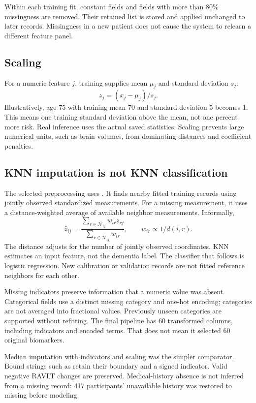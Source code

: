 Within each training fit, constant fields and fields with more than 80\% missingness are removed. Their retained list is stored and applied unchanged to later records. Missingness in a new patient does not cause the system to relearn a different feature panel.

\subsection{Scaling}
For a numeric feature $j$, training supplies mean $\mu_j$ and standard deviation $s_j$:
\begin{equation}z_j=(x_j-\mu_j)/s_j.\end{equation}
Illustratively, age 75 with training mean 70 and standard deviation 5 becomes 1. This means one training standard deviation above the mean, not one percent more risk. Real inference uses the actual saved statistics. Scaling prevents large numerical units, such as brain volumes, from dominating distances and coefficient penalties.

\subsection{KNN imputation is not KNN classification}
The selected preprocessing uses . It finds nearby fitted training records using jointly observed standardized measurements. For a missing measurement, it uses a distance-weighted average of available neighbor measurements. Informally,
\begin{equation}\widehat z_{ij}=\frac{\sum_{r\in\mathcal N_{ij}}w_{ir}z_{rj}}{\sum_{r\in\mathcal N_{ij}}w_{ir}},\qquad w_{ir}\propto 1/d(i,r).
\end{equation}
The distance adjusts for the number of jointly observed coordinates. KNN estimates an input feature, not the dementia label. The classifier that follows is logistic regression. New calibration or validation records are not fitted reference neighbors for each other.

Missing indicators preserve information that a numeric value was absent. Categorical fields use a distinct missing category and one-hot encoding; categories are not averaged into fractional values. Previously unseen categories are supported without refitting. The final pipeline has 60 transformed columns, including indicators and encoded terms. That does not mean it selected 60 original biomarkers.

Median imputation with indicators and scaling was the simpler comparator. Bound strings such as  retain their boundary and a signed indicator. Valid negative RAVLT changes are preserved. Medical-history absence is not inferred from a missing record: 417 participants' unavailable history was restored to missing before modeling.
\clearpage

